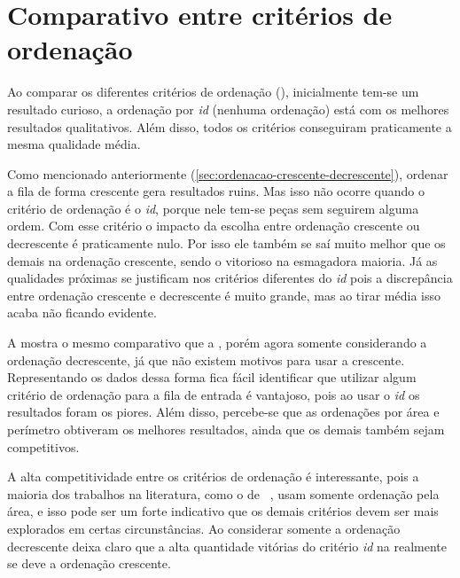 \section{Comparativo entre critérios de ordenação}\label{sec:comparativo-entre-criterios-de-ordenacao}

Ao comparar os diferentes critérios de ordenação (), inicialmente tem-se
um resultado curioso, a ordenação por \textit{id} (nenhuma ordenação) está com os melhores
resultados qualitativos.
Além disso, todos os critérios conseguiram praticamente a mesma qualidade média.



Como mencionado anteriormente (\cref{sec:ordenacao-crescente-decrescente}), ordenar a fila de
forma crescente gera resultados ruins.
Mas isso não ocorre quando o critério de ordenação é o \textit{id}, porque nele tem-se peças
sem seguirem alguma ordem.
Com esse critério o impacto da escolha entre ordenação crescente ou decrescente é praticamente
nulo.
Por isso ele também se saí muito melhor que os demais na ordenação crescente, sendo o vitorioso
na esmagadora maioria.
Já as qualidades próximas se justificam nos critérios diferentes do \textit{id} pois a
discrepância entre ordenação crescente e decrescente é muito grande, mas ao tirar média isso acaba
não ficando evidente.

A  mostra o mesmo comparativo que a , porém agora
somente considerando a ordenação decrescente, já que não existem motivos para usar a crescente.
Representando os dados dessa forma fica fácil identificar que utilizar algum critério de ordenação
para a fila de entrada é vantajoso, pois ao usar o \textit{id} os resultados foram os piores.
Além disso, percebe-se que as ordenações por área e perímetro obtiveram os melhores resultados,
ainda que os demais também sejam competitivos.



A alta competitividade entre os critérios de ordenação é interessante, pois a maioria dos trabalhos
na literatura, como o de \citeauthor*{chen2019efficient}~\citeyear{chen2019efficient}, usam somente
ordenação pela área, e isso pode ser um forte indicativo que os demais critérios devem ser mais
explorados em certas circunstâncias.
Ao considerar somente a ordenação decrescente deixa claro que a alta quantidade vitórias do critério
\textit{id} na  realmente se deve a ordenação crescente.
